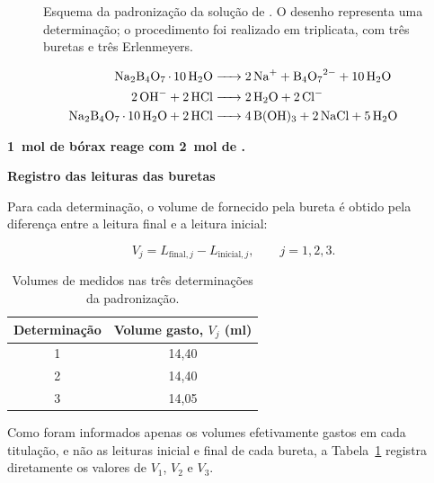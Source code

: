\documentclass[a4paper,12pt]{article}
\newcommand{\subtitulo}[1]{%
  \par\medskip
  {\color{quadroazul}\bfseries\large #1}\par\smallskip
}
\begin{document}
\begin{figure}[H]
{%
}
\caption{Esquema da padronização da solução de . O desenho representa uma determinação; o procedimento foi realizado em triplicata, com três buretas e três Erlenmeyers.}
\label{fig:padronizacao_hcl}
\end{figure}

\begin{tcolorbox}[
  title=Reações representadas no quadro,
  colback=quadrocinza,
  colframe=black!65,
  boxrule=0.6pt,
  arc=1mm
]
\begin{align*}
  \ce{Na2B4O7.10H2O &-> 2Na+ + B4O7^2- + 10H2O} \\
  \ce{2OH- + 2HCl &-> 2H2O + 2Cl-} \\
  \ce{Na2B4O7.10H2O + 2HCl &-> 4B(OH)3 + 2NaCl + 5H2O}
\end{align*}

\centering
\color{quadrovermelho}\bfseries
\qty{1}{\mole} de bórax reage com \qty{2}{\mole} de .
\end{tcolorbox}

\subtitulo{Registro das leituras das buretas}

Para cada determinação, o volume de  fornecido pela bureta é obtido pela diferença entre a leitura final e a leitura inicial:

\begin{equation*}
  V_j=L_{\text{final},j}-L_{\text{inicial},j},
  \qquad j=1,2,3.
\end{equation*}

\begin{table}[H]
\centering
\caption{Volumes de  medidos nas três determinações da padronização.}
\label{tab:leituras_buretas}
\renewcommand{\arraystretch}{1.35}
\begin{tabular}{c c}
\toprule
Determinação & Volume gasto, $V_j$ (\unit{\milli\litre}) \\
\midrule
1 & 14,40 \\
2 & 14,40 \\
3 & 14,05 \\
\bottomrule
\end{tabular}
\end{table}

Como foram informados apenas os volumes efetivamente gastos em cada titulação, e não as leituras inicial e final de cada bureta, a Tabela~\ref{tab:leituras_buretas} registra diretamente os valores de $V_1$, $V_2$ e $V_3$.
\end{document}
